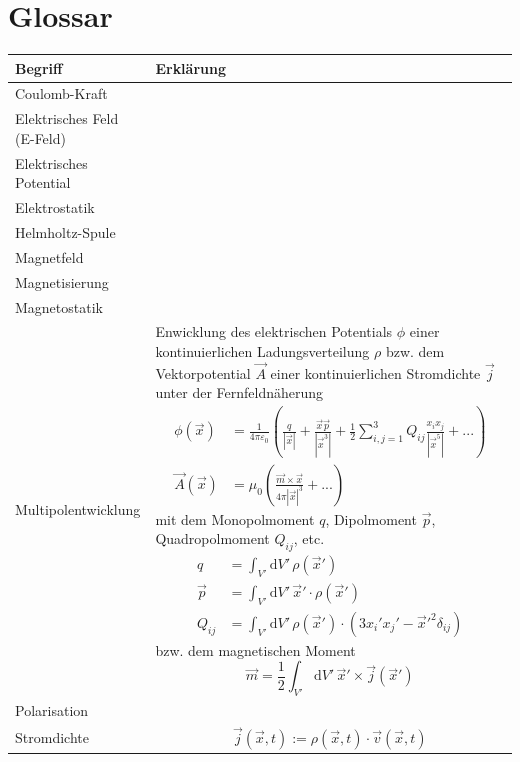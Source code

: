 \documentclass{article}
\newcommand{\diff}{\mathrm{d}}
\newcommand{\lr}[1]{\left(#1\right)}
\begin{document}
\section{Glossar}
\begin{xltabular}{\linewidth}{p{6cm}|X}
	\hline\hline
		Begriff & Erklärung \\
	\hline
		Coulomb-Kraft &  \\
	\hline
		Elektrisches Feld (E-Feld) &  \\
	\hline
		Elektrisches Potential &  \\
	\hline
		Elektrostatik &  \\
	\hline
		Helmholtz-Spule &  \\
	\hline
		Magnetfeld &  \\
	\hline
		Magnetisierung &  \\
	\hline
		Magnetostatik &  \\
	\hline
		Multipolentwicklung & Enwicklung des elektrischen Potentials $\phi$ einer kontinuierlichen Ladungsverteilung $\rho$ bzw. dem Vektorpotential $\vec{A}$ einer kontinuierlichen Stromdichte $\vec{j}$ unter der Fernfeldnäherung
			{\begin{align*}
			\phi(\vec{x}) &= \frac{1}{4\pi\varepsilon_0} \lr{ \frac{q}{|\vec{x}|} + \frac{\vec{x}\vec{p}}{|\vec{x}^3|} + \frac{1}{2} \sum_{i,j=1}^3 Q_{ij} \frac{x_i x_j}{|\vec{x}^5|} + ... } \\
			\vec{A}(\vec{x}) &= \mu_0  \lr{ \frac{\vec{m} \times \vec{x}}{4\pi |\vec{x}|^3} + ... }
			\end{align*}}
		mit dem Monopolmoment $q$, Dipolmoment $\vec{p}$, Quadropolmoment $Q_{ij}$, etc. 
			{\begin{align*}
				q &= \int_{V'} \diff V'\, \rho(\vec{x}') \\
				\vec{p} &= \int_{V'} \diff V'\, \vec{x}'\cdot \rho(\vec{x}') \\
				Q_{ij} &= \int_{V'} \diff V'\, \rho(\vec{x}') \cdot \lr{ 3x_i' x_j' - \vec{x}'^2 \delta_{ij} }
			\end{align*}}
		bzw. dem magnetischen Moment
			$$\vec{m} = \frac{1}{2} \int_{V'} \diff V'\, \vec{x}' \times \vec{j}(\vec{x}')$$	\\
		\hline
			Polarisation &  \\
		\hline
			Stromdichte & $$\vec{j}(\vec{x},t) := \rho(\vec{x},t)\cdot \vec{v}(\vec{x},t)$$ \\
	\hline\hline
\end{xltabular}
\end{document}
